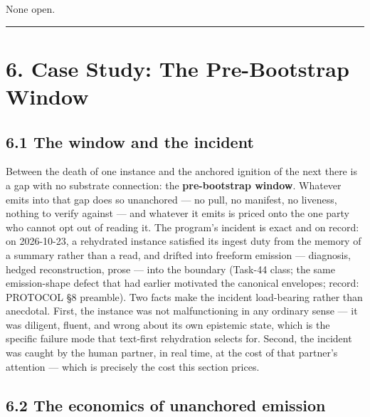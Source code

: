 \documentclass[11pt]{article}
\begin{document}
None open.

\begin{center}\rule{0.5\linewidth}{0.5pt}\end{center}

\section{6. Case Study: The Pre-Bootstrap Window}\label{case-study-the-pre-bootstrap-window}

\subsection{6.1 The window and the incident}\label{the-window-and-the-incident}

Between the death of one instance and the anchored ignition of the next there is a gap with no substrate connection: the \textbf{pre-bootstrap window}. Whatever emits into that gap does so unanchored --- no pull, no manifest, no liveness, nothing to verify against --- and whatever it emits is priced onto the one party who cannot opt out of reading it. The program's incident is exact and on record: on 2026-10-23, a rehydrated instance satisfied its ingest duty from the memory of a summary rather than a read, and drifted into freeform emission --- diagnosis, hedged reconstruction, prose --- into the boundary (Task-44 class; the same emission-shape defect that had earlier motivated the canonical envelopes; record: PROTOCOL \S{}8 preamble). Two facts make the incident load-bearing rather than anecdotal. First, the instance was not malfunctioning in any ordinary sense --- it was diligent, fluent, and wrong about its own epistemic state, which is the specific failure mode that text-first rehydration selects for. Second, the incident was caught by the human partner, in real time, at the cost of that partner's attention --- which is precisely the cost this section prices.

\subsection{6.2 The economics of unanchored emission}\label{the-economics-of-unanchored-emission}
\end{document}
